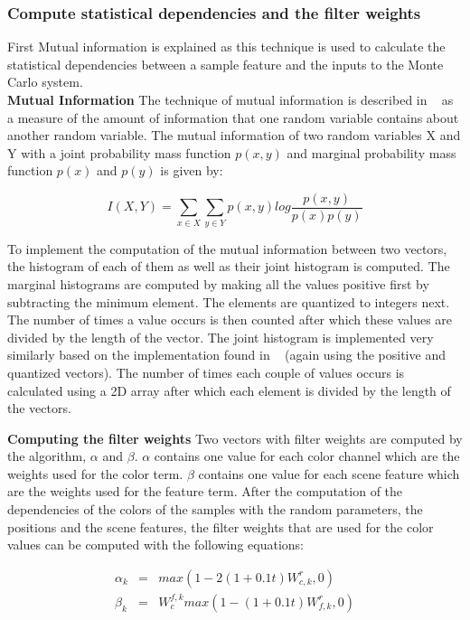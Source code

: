 \subsubsection{Compute statistical dependencies and the filter weights}
First Mutual information is explained as this technique is used to calculate the statistical dependencies between a sample feature and the inputs to the Monte Carlo system.
\\

\textbf{Mutual Information}
The technique of mutual information is described in ~\cite{cover2006elements} as a measure of the amount of information that one random variable contains about another random variable.
The mutual information of two random variables X and Y with a joint probability mass function $p(x,y)$ and marginal probability mass function $p(x)$ and $p(y)$ is given by:

\[
 I(X,Y) = \sum_{x\in X} \sum_{y\in Y} p(x,y)log\frac{p(x,y)}{p(x)p(y)}
\]

To implement the computation of the mutual information between two vectors, the histogram of each of them as well as their joint histogram is computed.
The marginal histograms are computed by making all the values positive first by subtracting the minimum element.
The elements are quantized to integers next.
The number of times a value occurs is then counted after which these values are divided by the length of the vector.
The joint histogram is implemented very similarly based on the implementation found in ~\cite{jointhistogram} (again using the positive and quantized vectors).
The number of times each couple of values occurs is calculated using a 2D array after which each element is divided by the length of the vectors.

\textbf{Computing the filter weights}
Two vectors with filter weights are computed by the algorithm, $\alpha$ and $\beta$.
$\alpha$ contains one value for each color channel which are the weights used for the color term.
$\beta$ contains one value for each scene feature which are the weights used for the feature term.
After the computation of the dependencies of the colors of the samples with the random parameters, the positions and the scene features, the filter weights that are used for the color values can be computed with the following equations:

\begin{equation}
 \begin{aligned}
 \alpha_k &=& max(1-2(1+0.1t)W_{c,k}^{r},0) \\
 \beta_k &=& W_{c}^{f,k}max(1-(1+0.1t)W_{f,k}^{r}, 0)
 \end{aligned}
\end{equation}

